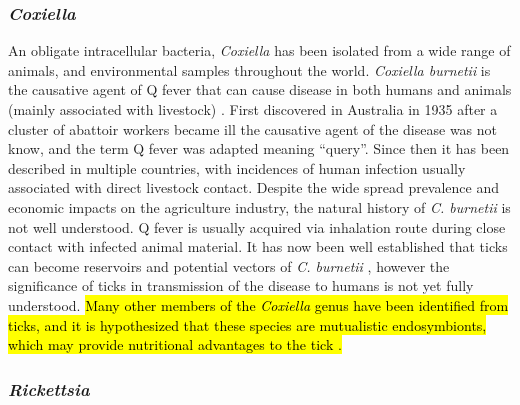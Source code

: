 \documentclass[a4paper, nobind]{templates/ociamthesis}
\begin{document}
\hypertarget{coxiella}{%
\subsubsection{\texorpdfstring{\emph{Coxiella}}{Coxiella}}\label{coxiella}}

An obligate intracellular bacteria, \emph{Coxiella} has been isolated from a wide range of animals, and environmental samples throughout the world.
\emph{Coxiella burnetii} is the causative agent of Q fever that can cause disease in both humans and animals (mainly associated with livestock) \autocite{gonzalez-barrioCoxiellaBurnetiiWild2018}.
First discovered in Australia in 1935 after a cluster of abattoir workers became ill \autocite{derrickFEVERNEWFEVER1937} the causative agent of the disease was not know, and the term Q fever was adapted meaning ``query''.
Since then it has been described in multiple countries, with incidences of human infection usually associated with direct livestock contact.
Despite the wide spread prevalence and economic impacts on the agriculture industry, the natural history of \emph{C. burnetii} is not well understood.
Q fever is usually acquired via inhalation route during close contact with infected animal material.
It has now been well established that ticks can become reservoirs and potential vectors of \emph{C. burnetii} \autocite{arricau-bouveryFeverEmergingReemerging2005}, however the significance of ticks in transmission of the disease to humans is not yet fully understood.
\hl{Many other members of the \emph{Coxiella} genus have been identified from ticks, and it is hypothesized that these species are mutualistic endosymbionts, which may provide nutritional advantages to the tick \autocite{kobayashiMolecularDetectionGenotyping2021}.}

\hypertarget{rickettsia}{%
\subsubsection{\texorpdfstring{\emph{Rickettsia}}{Rickettsia}}\label{rickettsia}}
\end{document}
